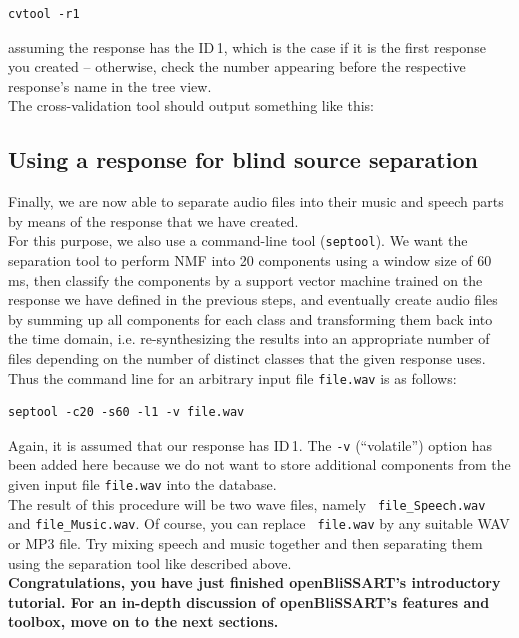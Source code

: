 \begin{verbatim}
cvtool -r1
\end{verbatim}

assuming the response has the ID\,1, which is the case if it is the first
response you created -- otherwise, check the number appearing before the
respective response's name in the tree view.\\
The cross-validation tool should output something like this:




\subsection{Using a response for blind source separation}

Finally, we are now able to separate audio files into their music and speech
parts by means of the response that we have created.\\

For this purpose, we also use a command-line tool ({\tt septool}). We want the
separation tool to perform NMF into 20 components using a window size of 60\,ms,
then classify the components by a support vector machine trained on the response
we have defined in the previous steps, and eventually create audio files by
summing up all components for each class and transforming them back into the
time domain, i.e. re-synthesizing the results into an appropriate number of
files depending on the number of distinct classes that the given response
uses. Thus the command line for an arbitrary input file \verb|file.wav| is as
follows:

\begin{verbatim}
septool -c20 -s60 -l1 -v file.wav
\end{verbatim}

Again, it is assumed that our response has ID\,1. The {\tt -v} (``volatile'')
option has been added here because we do not want to store additional components
from the given input file \verb|file.wav| into the database.\\

The result of this procedure will be two wave files, namely {\tt
  file\_Speech.wav} and {\tt file\_Music.wav}. Of course, you can replace {\tt
  file.wav} by any suitable WAV or MP3 file. Try mixing speech and music
together and then separating them using the separation tool like described above.\\

\noindent \textbf{Congratulations, you have just finished openBliSSART's
  introductory tutorial. For an in-depth discussion of openBliSSART's features
  and toolbox, move on to the next sections.}
